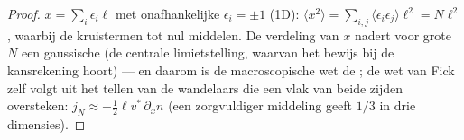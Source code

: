 \begin{proof}
$x = \sum_i \epsilon_i\ell$ met onafhankelijke $\epsilon_i = \pm1$ (1D):
$\langle x^2\rangle = \sum_{i,j}\langle\epsilon_i\epsilon_j\rangle\ell^2 =
N\ell^2$,
waarbij de kruistermen tot nul middelen. De verdeling van $x$
nadert voor grote $N$ een gaussische (de centrale limietstelling, waarvan het
bewijs bij de kansrekening hoort) --- en daarom is de
macroscopische wet de ; de wet van Fick zelf volgt
uit het tellen van de wandelaars die een vlak van beide zijden oversteken:
$j_N \approx
-\tfrac12\ell v^*\,\partial_x n$ (een zorgvuldiger middeling
geeft $1/3$ in
drie dimensies).
\end{proof}

\begin{omfigure}
\begin{tikzpicture}[scale=0.85]

\end{tikzpicture}
\end{omfigure}
